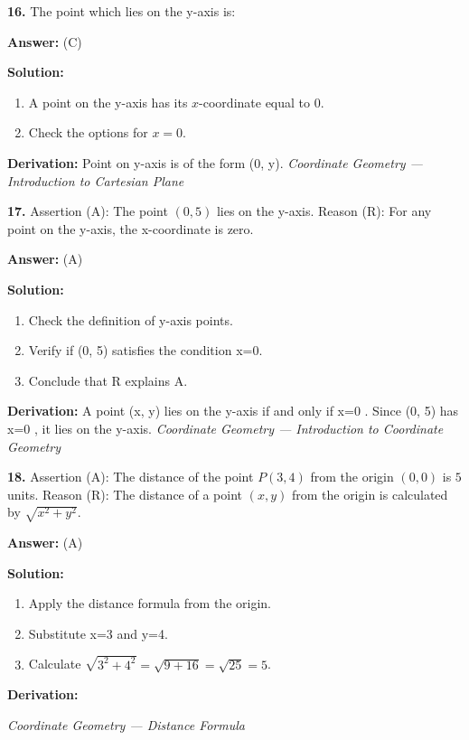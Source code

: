 \documentclass[12pt,a4paper]{exam}
\newcommand{\fitmath}[1]{%
  \sbox{\schmathbox}{$\displaystyle #1$}%
  \ifdim\wd\schmathbox>\linewidth
    \resizebox{\linewidth}{!}{\usebox{\schmathbox}}%
  \else
    \usebox{\schmathbox}%
  \fi}
\begin{document}
\begin{questions}
\question \textbf{16.} The point which lies on the y-axis is:

\textbf{Answer:}
(C)

\textbf{Solution:}
\begin{enumerate}
  \item A point on the y-axis has its $x$-coordinate equal to 0.
  \item Check the options for $x=0$.
\end{enumerate}
\textbf{Derivation:}
Point on y-axis is of the form (0, y).
\hfill \textit{Coordinate Geometry — Introduction to Cartesian Plane}
\vspace{0.3cm}

\question \textbf{17.} Assertion (A): The point $(0, 5)$ lies on the y-axis. Reason (R): For any point on the y-axis, the x-coordinate is zero.

\textbf{Answer:}
(A)

\textbf{Solution:}
\begin{enumerate}
  \item Check the definition of y-axis points.
  \item Verify if (0, 5) satisfies the condition x=0.
  \item Conclude that R explains A.
\end{enumerate}
\textbf{Derivation:}
A point  (x, y)  lies on the y-axis if and only if  x=0 . Since  (0, 5)  has  x=0 , it lies on the y-axis.
\hfill \textit{Coordinate Geometry — Introduction to Coordinate Geometry}
\vspace{0.3cm}

\question \textbf{18.} Assertion (A): The distance of the point $P(3, 4)$ from the origin $(0, 0)$ is $5$ units. Reason (R): The distance of a point $(x, y)$ from the origin is calculated by $\sqrt{x^2 + y^2}$.

\textbf{Answer:}
(A)

\textbf{Solution:}
\begin{enumerate}
  \item Apply the distance formula from the origin.
  \item Substitute x=3 and y=4.
  \item Calculate $\sqrt{3^2 + 4^2} = \sqrt{9+16} = \sqrt{25} = 5$.
\end{enumerate}
\textbf{Derivation:}
\begin{center}
\fitmath{d = \sqrt{(3-0)^2 + (4-0)^2} = \sqrt{3^2 + 4^2} = \sqrt{9+16} = 5}
\end{center}
\hfill \textit{Coordinate Geometry — Distance Formula}
\vspace{0.3cm}


\end{questions}
\end{document}
